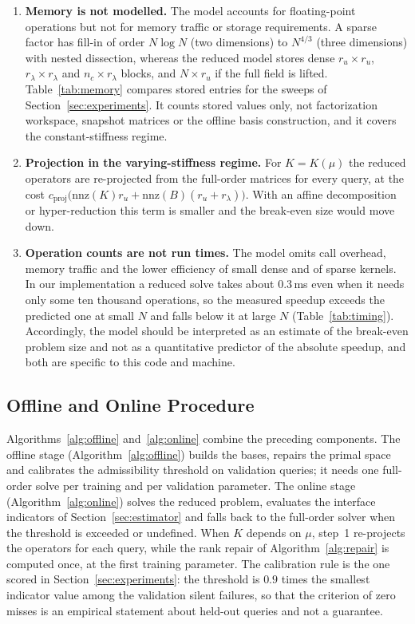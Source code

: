 \documentclass[11pt,a4paper]{article}
\begin{document}
\begin{enumerate}
\item \textbf{Memory is not modelled.} The model accounts for floating-point operations but not for memory traffic or storage requirements. A sparse factor has fill-in of order $N \log N$ (two dimensions) to $N^{4/3}$ (three dimensions) with nested dissection, whereas the reduced model stores dense $r_u \times r_u$, $r_\lambda \times r_\lambda$ and $n_c \times r_\lambda$ blocks, and $N \times r_u$ if the full field is lifted. Table~\ref{tab:memory} compares stored entries for the sweeps of Section~\ref{sec:experiments}. It counts stored values only, not factorization workspace, snapshot matrices or the offline basis construction, and it covers the constant-stiffness regime.
\item \textbf{Projection in the varying-stiffness regime.} For $K = K(\mu)$ the reduced operators are re-projected from the full-order matrices for every query, at the cost $c_{\mathrm{proj}}\bigl(\mathrm{nnz}(K) r_u + \mathrm{nnz}(B)(r_u + r_\lambda)\bigr)$. With an affine decomposition or hyper-reduction this term is smaller and the break-even size would move down.
\item \textbf{Operation counts are not run times.} The model omits call overhead, memory traffic and the lower efficiency of small dense and of sparse kernels. In our implementation a reduced solve takes about $0.3$\,ms even when it needs only some ten thousand operations, so the measured speedup exceeds the predicted one at small $N$ and falls below it at large $N$ (Table~\ref{tab:timing}). Accordingly, the model should be interpreted as an estimate of the break-even problem size and not as a quantitative predictor of the absolute speedup, and both are specific to this code and machine.
\end{enumerate}

\hypertarget{offline-and-online-procedure}{%
\subsection{Offline and Online Procedure}\label{offline-and-online-procedure}}

Algorithms~\ref{alg:offline} and~\ref{alg:online} combine the preceding components. The offline stage (Algorithm~\ref{alg:offline}) builds the bases, repairs the primal space and calibrates the admissibility threshold on validation queries; it needs one full-order solve per training and per validation parameter. The online stage (Algorithm~\ref{alg:online}) solves the reduced problem, evaluates the interface indicators of Section~\ref{sec:estimator} and falls back to the full-order solver when the threshold is exceeded or undefined. When \(K\) depends on \(\mu\), step~1 re-projects the operators for each query, while the rank repair of Algorithm~\ref{alg:repair} is computed once, at the first training parameter. The calibration rule is the one scored in Section~\ref{sec:experiments}: the threshold is \(0.9\) times the smallest indicator value among the validation silent failures, so that the criterion of zero misses is an empirical statement about held-out queries and not a guarantee.
\end{document}
